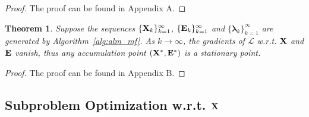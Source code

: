 \documentclass[10pt,twocolumn,letterpaper]{article}
\newtheorem{theorem}{Theorem}
\newcommand\mycomment[1]{}
\def\calP{\mathcal{P}}
\def\bE{{\bf E}}
\def\blambda{{\bm \lambda}}
\def\calL{{\mathcal{L}}}
\def\bL{{\bf L}}
\def\bX{{\bf X}}
\def\bX{{\bf X}}
\begin{document}
\begin{proof}
  The proof can be found in Appendix A.
  \mycomment{
  By the optimality of $\bE_{t+1}$ in Step 2 in Algorithm~\ref{alg:alm_mf}, we have the sub-differential of $\calL$ w.r.t. $\bE$ as zeros:
  {
  \begin{align}
  \label{eq:derivatives_calL_E}
    0 & \in \frac{\calL(\bX_{t+1}, \bE_{t}, \blambda_{t}, \mu_{t})}{\bE_{t+1}} \nonumber \\
      & = \partial(|| \bE_{t+1} ||_{1,2}) + \blambda_{t} + \mu_{t} (\calP_{\Omega} (\bL - \bX_{t+1} - \bE_{t+1})) \nonumber \\
      & = \partial(|| \bE_{t+1} ||_{1,2}) + \blambda_{t+1}   \nonumber \\
    \Rightarrow & -\blambda_{t+1} \in \partial(|| \bE_{t+1} ||_{1,2})  .
  \end{align}
  }
  \noindent
  Consider the computation of $\bE_{t+1}$ in Eq~(\ref{eq:column_wise_soft_thresholding}), which is associated with $\bL, \bX_{t+1}$, $\blambda_{t}$ and $\mu_{t}$.
  $\bL$ is the observation and thus bounded.
  $\bX_{t+1}$ is bounded due to the convergence guarantee of Step 1 in Algorithm~\ref{alg:alm_mf}~\cite{vandereycken2013lowrank}.
  $\{ \blambda_{t} \}$ is initialized by setting $\blambda_{0} = 0$ and $\{ \mu_{t} \}$ is non-decreasing.
  Thus when updating by Algorithm~\ref{alg:alm_mf}, $\bE_{t+1}$, $\partial(\bE_{t+1})$ and $\blambda_{t}$ are all bounded accordingly as $t$ increases.
  This completes the proof.
  }
\end{proof}

\begin{theorem}
\label{theorem:alm_convergence}
  Suppose the sequences $\{\bX_k\}_{k=1}^{\infty}$, $\{\bE_k\}_{k=1}^{\infty}$ and $\{\blambda_k\}_{k=1}^{\infty}$ are generated by Algorithm~\ref{alg:alm_mf}.
  As $k \to \infty$, the gradients of $\calL$ w.r.t. $\bX$ and $\bE$ vanish,
  thus any accumulation point $(\bX^*, \bE^*)$ is a stationary point.
\end{theorem}

\begin{proof}
\label{proof:proof_AA}
  The proof can be found in Appendix B.
\end{proof}


\subsection{Subproblem Optimization w.r.t. $\bX$}
\end{document}
